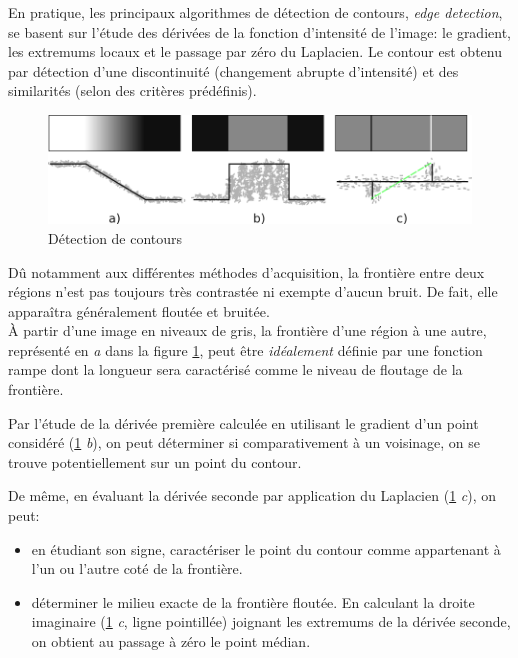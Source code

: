 \documentclass[a4paper,12pt]{report}
\begin{document}
En pratique, les principaux algorithmes de détection de contours, \textit{edge detection}, se basent sur l'étude des dérivées de la fonction d'intensité de l'image: le gradient, les extremums locaux et le passage par zéro du Laplacien. Le contour est obtenu par détection d'une discontinuité (changement abrupte d'intensité) et des similarités (selon des critères prédéfinis).\\

\begin{figure}[hbtp]
\centering
\includegraphics[scale=0.6]{figureDetectionDiscontinuities.png}
\caption{Détection de contours}
\label{fig:DetectionDiscontinuities}
\end{figure}

Dû notamment aux différentes méthodes d'acquisition, la frontière entre deux régions n'est pas toujours très contrastée ni exempte d'aucun bruit. De fait, elle apparaîtra généralement floutée et bruitée.\\ 
\`A partir d'une image en niveaux de gris, la frontière d'une région à une autre, représenté en \textit{a} dans la figure \ref{fig:DetectionDiscontinuities}, peut être \textit{idéalement} définie par une fonction rampe dont la longueur sera caractérisé comme le niveau de floutage de la frontière. 

Par l'étude de la dérivée première calculée en utilisant le gradient d'un point considéré (\ref{fig:DetectionDiscontinuities} \textit{b}), on peut déterminer si comparativement à un voisinage, on se trouve potentiellement sur un point du contour. 

De même, en évaluant la dérivée seconde par application du Laplacien (\ref{fig:DetectionDiscontinuities} \textit{c}), on peut:\begin{itemize}
\item en étudiant son signe, caractériser le point du contour comme appartenant à l'un ou l'autre coté de la frontière.
\item déterminer le milieu exacte de la frontière floutée. En calculant la droite imaginaire (\ref{fig:DetectionDiscontinuities} \textit{c}, ligne pointillée) joignant les extremums de la dérivée seconde, on obtient au passage à zéro le point médian.\\
\end{itemize}
\end{document}

